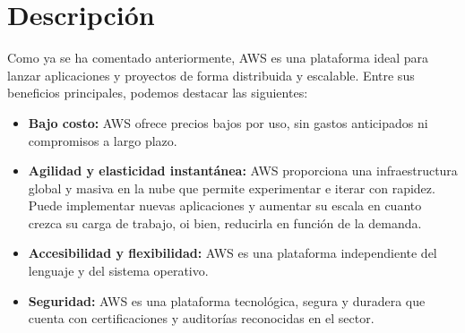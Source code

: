 \section{Descripción}
Como ya se ha comentado anteriormente, AWS es una plataforma ideal para lanzar aplicaciones y proyectos de forma distribuida y escalable. Entre sus beneficios principales, podemos destacar las siguientes:
\begin{itemize}
	\item \textbf{Bajo costo:} AWS ofrece precios bajos por uso, sin gastos anticipados ni compromisos a largo plazo.
	\item \textbf{Agilidad y elasticidad instantánea:} AWS proporciona una infraestructura global y masiva en la nube que permite experimentar e iterar con rapidez. Puede implementar nuevas aplicaciones y aumentar su escala en cuanto crezca su carga de trabajo, oi bien, reducirla en función de la demanda.
	\item \textbf{Accesibilidad y flexibilidad:} AWS es una plataforma independiente del lenguaje y del sistema operativo.
	\item \textbf{Seguridad:} AWS es una plataforma tecnológica, segura y duradera que cuenta con certificaciones y auditorías reconocidas en el sector.
\end{itemize}